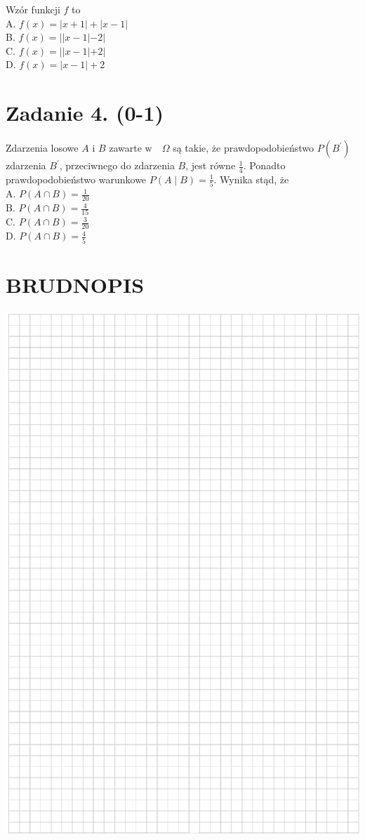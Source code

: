 \documentclass[10pt]{article}
\begin{document}
Wzór funkcji \(f\) to\\
A. \(f(x)=|x+1|+|x-1|\)\\
B. \(f(x)=||x-1|-2|\)\\
C. \(f(x)=||x-1|+2|\)\\
D. \(f(x)=|x-1|+2\)

\section*{Zadanie 4. (0-1)}
Zdarzenia losowe \(A\) i \(B\) zawarte \(\mathrm{w} \quad \Omega\) są takie, że prawdopodobieństwo \(P\left(B^{\prime}\right)\) zdarzenia \(B^{\prime}\), przeciwnego do zdarzenia \(B\), jest równe \(\frac{1}{4}\). Ponadto prawdopodobieństwo warunkowe \(P(A \mid B)=\frac{1}{5}\). Wynika stąd, że\\
A. \(P(A \cap B)=\frac{1}{20}\)\\
B. \(P(A \cap B)=\frac{4}{15}\)\\
C. \(P(A \cap B)=\frac{3}{20}\)\\
D. \(P(A \cap B)=\frac{4}{5}\)

\section*{BRUDNOPIS}
\begin{center}
\includegraphics[max width=\textwidth]{2024_11_21_9df891ea1c7ef9791261g-03}
\end{center}
\end{document}
